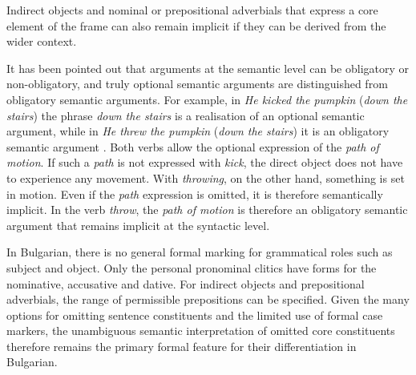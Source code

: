 \documentclass[output=paper,colorlinks,citecolor=brown]{langscibook}
\begin{document}
 \begin{exe}
 
 
 
\end{exe} 
 

Indirect objects and nominal or prepositional adverbials that express a core element of the frame can also remain implicit if they can be derived from the wider context.

It has been pointed out that arguments at the semantic level can be obligatory or non-obligatory, and truly optional semantic arguments are distinguished from obligatory semantic arguments. For example, in \textit{He kicked the pumpkin} (\textit{down the stairs}) the phrase \textit{down the stairs} is a realisation of an optional semantic argument, while in \textit{He threw the pumpkin} (\textit{down the stairs}) it is an obligatory semantic argument \citep[174--176]{Culicover2005}. Both verbs allow the optional expression of the \emph{path of motion}. If such a \emph{path} is not expressed with \textit{kick}, the direct object does not have to experience any movement. With \textit{throwing}, on the other hand, something is set in motion. Even if the \emph{path} expression is omitted, it is therefore semantically implicit. In the verb \textit{throw}, the \emph{path of motion} is therefore an obligatory semantic argument that remains implicit at the syntactic level.

In Bulgarian, there is no general formal marking for grammatical roles such as subject and object. Only the personal pronominal clitics have forms for the nominative, accusative and dative. For indirect objects and prepositional adverbials, the range of permissible prepositions can be specified. Given the many options for omitting sentence constituents and the limited use of formal case markers, the unambiguous semantic interpretation of omitted core constituents therefore remains the primary formal feature for their differentiation in Bulgarian.
\end{document}
